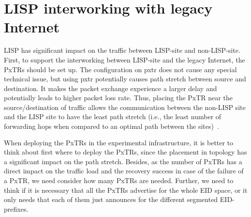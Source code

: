 \section{LISP interworking with legacy Internet}
\label{sec:interworking}

LISP has significant impact on the traffic between LISP-site and non-LISP-site. First, to support the interworking between LISP-site and the legacy Internet, the PxTRs should be set up. The configuration on \acrshort{pxtr} does not cause any special technical issue, but using \acrshort{pxtr} potentially causes path stretch between source and destination. It makes the packet exchange experience a larger delay and potentially leads to higher packet loss rate. Thus, placing the PxTR near the source/destination of traffic allows the communication between the non-LISP site and the LISP site to have the least path stretch (i.e., the least number of forwarding hops when compared to an optimal path between the sites)~\cite{rfc6832}. %

When deploying the PxTRs in the experimental infrastructure, it is better to think about first where to deploy the PxTRs, since the placement in topology has a significant impact on the path stretch. Besides, as the number of PxTRs has a direct impact on the traffic load and the recovery success in case of the failure of a PxTR, we need consider how many PxTRs are needed. Further, we need to think if it is necessary that all the PxTRs advertise for the whole EID space, or it only needs that each of them just announces for the different segmented EID-prefixes.

